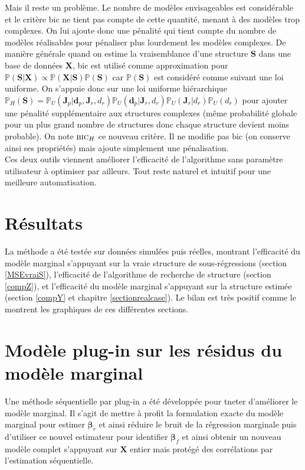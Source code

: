 \documentclass[12pt,a4paper]{report}
\begin{document}
		Mais il reste un problème. Le nombre de modèles envisageables est considérable et le critère {\sc bic} ne tient pas compte de cette quantité, menant à des modèles trop complexes. On lui ajoute donc une pénalité qui tient compte du nombre de modèles réalisables pour pénaliser plus lourdement les modèles complexes.
	De manière générale quand on estime la vraisemblance d'une structure $\boldsymbol{S}$ dans une base de données $\boldsymbol{X}$, {\sc bic} est utilisé comme approximation pour $\mathbb{P}(\boldsymbol{S}|\boldsymbol{X})\propto  \mathbb{P}(\boldsymbol{X}|\boldsymbol{S})\mathbb{P}(\boldsymbol{S})$  	car $\mathbb{P}(\boldsymbol{S})$ est considéré comme suivant une loi uniforme. On s'appuie donc sur une loi uniforme hiérarchique $\mathbb{P}_{H}(\boldsymbol{S})=\mathbb{P}_{U}(\boldsymbol{J}_p | \boldsymbol{d}_p,\boldsymbol{J}_r,d_r)\mathbb{P}_{U}(\boldsymbol{d}_p|\boldsymbol{J}_r,d_r)\mathbb{P}_{U}(\boldsymbol{J}_r|d_r)\mathbb{P}_{U}(d_r)$ pour ajouter une pénalité supplémentaire aux structures complexes (même probabilité globale pour un plus grand nombre de structures donc chaque structure devient moins probable). 
On note $\mbox{{\sc bic}}_H$ ce nouveau critère. Il ne modifie pas {\sc bic} (on conserve ainsi ses propriétés) mais ajoute simplement une pénalisation.\\

	Ces deux outils viennent améliorer l'efficacité de l'algorithme sans paramètre utilisateur à optimiser par ailleurs. Tout reste naturel et intuitif pour une meilleure automatisation.

	\section{Résultats}
		La méthode a été testée sur données simulées puis réelles, montrant l'efficacité du modèle marginal s'appuyant sur la vraie structure de sous-régressions (section \ref{MSEvraiS}), l'efficacité de l'algorithme de recherche de structure (section \ref{compZ}), et l'efficacité du modèle marginal s'appuyant sur la structure estimée (section \ref{compY} et chapitre \ref{sectionrealcase}). Le bilan est très positif comme le montrent les graphiques de ces différentes sections.
	\section{Modèle plug-in sur les résidus du modèle marginal}
		Une méthode séquentielle par plug-in a été développée pour tneter d'améliorer le modèle marginal. Il s'agit de mettre à profit la formulation exacte du modèle marginal pour estimer $\boldsymbol{\beta}_r$ et ainsi réduire le bruit de la régression marginale puis d'utiliser ce nouvel estimateur pour identifier $\boldsymbol{\beta}_f$ et ainsi obtenir un nouveau modèle complet s'appuyant sur $\boldsymbol{X}$ entier mais protégé des corrélations par l'estimation séquentielle.\\
		
\end{document}
